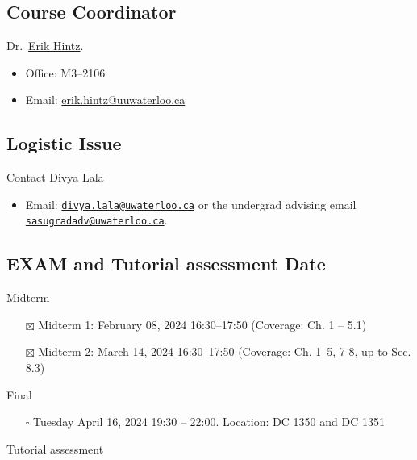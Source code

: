 \documentclass[
]{book}
\providecommand{\tightlist}{%
  \setlength{\itemsep}{0pt}\setlength{\parskip}{0pt}}
\theoremstyle{definition}
\theoremstyle{definition}
\theoremstyle{definition}
\theoremstyle{definition}
\theoremstyle{remark}
\begin{document}
\subsection{Course Coordinator}\label{course-coordinator}

Dr.~\href{https://uwaterloo.ca/scholar/ehintz}{Erik Hintz}.

\begin{itemize}
\tightlist
\item
  Office: M3--2106
\item
  Email: \href{mailto:erik.hintz@uwaterloo.ca}{erik.hintz@uuwaterloo.ca}
\end{itemize}

\subsection{Logistic Issue}\label{logistic-issue}

Contact Divya Lala

\begin{itemize}
\tightlist
\item
  Email: \href{mailto:divya.lala@uwaterloo.ca}{\nolinkurl{divya.lala@uwaterloo.ca}} or the undergrad advising email \href{mailto:sasugradadv@uwaterloo.ca}{\nolinkurl{sasugradadv@uwaterloo.ca}}.
\end{itemize}

\subsection{EXAM and Tutorial assessment Date}\label{exam-and-tutorial-assessment-date}

Midterm

\begin{itemize}
\tightlist
\item[$\boxtimes$]
  Midterm 1: February 08, 2024 16:30--17:50 (Coverage: Ch. 1 -- 5.1)
\item[$\boxtimes$]
  Midterm 2: March 14, 2024 16:30--17:50 (Coverage: Ch. 1--5, 7-8, up to Sec. 8.3)
\end{itemize}

Final

\begin{itemize}
\tightlist
\item[$\square$]
  Tuesday April 16, 2024 19:30 -- 22:00. Location: DC 1350 and DC 1351
\end{itemize}

Tutorial assessment
\end{document}
